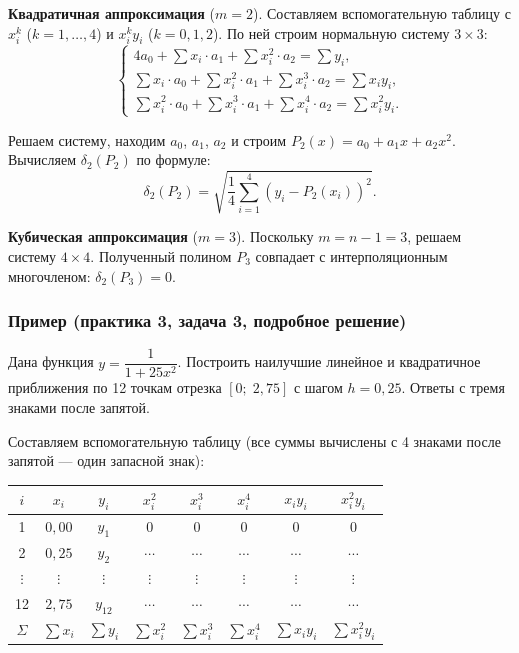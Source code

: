 \textbf{Квадратичная аппроксимация} ($m = 2$). Составляем вспомогательную таблицу с $x_i^k$ ($k = 1, \ldots, 4$) и $x_i^k y_i$ ($k = 0, 1, 2$). По ней строим нормальную систему $3 \times 3$:
\[
    \begin{cases}
        4a_0 + \sum x_i \cdot a_1 + \sum x_i^2 \cdot a_2 = \sum y_i, \\
        \sum x_i \cdot a_0 + \sum x_i^2 \cdot a_1 + \sum x_i^3 \cdot a_2 = \sum x_i y_i, \\
        \sum x_i^2 \cdot a_0 + \sum x_i^3 \cdot a_1 + \sum x_i^4 \cdot a_2 = \sum x_i^2 y_i.
    \end{cases}
\]

Решаем систему, находим $a_0$, $a_1$, $a_2$ и строим $P_2(x) = a_0 + a_1 x + a_2 x^2$. Вычисляем $\delta_2(P_2)$ по формуле:
\[
    \delta_2(P_2) = \sqrt{\frac{1}{4} \sum_{i=1}^{4} (y_i - P_2(x_i))^2}.
\]

\textbf{Кубическая аппроксимация} ($m = 3$). Поскольку $m = n - 1 = 3$, решаем систему $4 \times 4$. Полученный полином $P_3$ совпадает с интерполяционным многочленом: $\delta_2(P_3) = 0$.


\subsubsection*{Пример (практика 3, задача 3, подробное решение)}

Дана функция $y = \dfrac{1}{1 + 25x^2}$. Построить наилучшие линейное и квадратичное приближения по 12 точкам отрезка $[0;\; 2{,}75]$ с шагом $h = 0{,}25$. Ответы с тремя знаками после запятой.

Составляем вспомогательную таблицу (все суммы вычислены с 4 знаками после запятой --- один запасной знак):

\begin{center}
\begin{tabular}{c|c|c|c|c|c|c|c}
    $i$ & $x_i$ & $y_i$ & $x_i^2$ & $x_i^3$ & $x_i^4$ & $x_i y_i$ & $x_i^2 y_i$ \\
    \hline
    1 & $0{,}00$ & $y_1$ & $0$ & $0$ & $0$ & $0$ & $0$ \\
    2 & $0{,}25$ & $y_2$ & $\cdots$ & $\cdots$ & $\cdots$ & $\cdots$ & $\cdots$ \\
    $\vdots$ & $\vdots$ & $\vdots$ & $\vdots$ & $\vdots$ & $\vdots$ & $\vdots$ & $\vdots$ \\
    12 & $2{,}75$ & $y_{12}$ & $\cdots$ & $\cdots$ & $\cdots$ & $\cdots$ & $\cdots$ \\
    \hline
    $\Sigma$ & $\sum x_i$ & $\sum y_i$ & $\sum x_i^2$ & $\sum x_i^3$ & $\sum x_i^4$ & $\sum x_i y_i$ & $\sum x_i^2 y_i$
\end{tabular}
\end{center}

